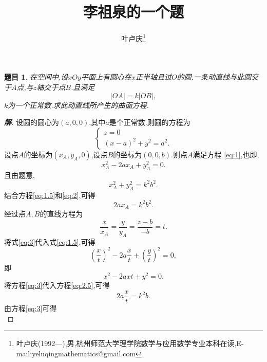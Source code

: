 \documentclass[a4paper]{article}
\newtheorem*{exe}{题目}
\newenvironment{exercise}
{\bigskip\begin{mdframed}\begin{exe}}
    {\end{exe}\end{mdframed}\bigskip}
\begin{document}
\title{\huge{\bf{李祖泉的一个题}}} \author{\small{叶卢庆\footnote{叶卢庆(1992---),男,杭州师范大学理学院数学与应用数学专业本科在读,E-mail:yeluqingmathematics@gmail.com}}}
\maketitle
\begin{exercise}
在空间中,设$xOy$平面上有圆心在$x$正半轴且过$O$的圆.一条动直线与此圆交
于$A$点,与$z$轴交于点$B$.且满足
$$
|OA|=k|OB|,
$$
$k$为一个正常数.求此动直线所产生的曲面方程.
\end{exercise}
\begin{proof}[\textbf{解}]
设圆的圆心为$(a,0,0)$,其中$a$是个正常数.则圆的方程为
\begin{equation}\label{eq:1}
\begin{cases}
z=0\\
(x-a)^2+y^2=a^2.
\end{cases}
\end{equation}
设点$A$的坐标为$(x_A,y_A,0)$,设点$B$的坐标为$(0,0,b)$.则点$A$满足方程
\eqref{eq:1},也即,
\begin{equation}\label{eq:1.5}
  x_A^2-2ax_A+y_{A}^2=0.
\end{equation}
且由题意,
\begin{equation}\label{eq:2}
x_A^2+y_A^2=k^2b^2.
\end{equation}
结合方程\eqref{eq:1.5}和\eqref{eq:2},可得
\begin{equation}
  \label{eq:2.5}
  2ax_A=k^2b^2.
\end{equation}
经过点$A,B$的直线方程为
\begin{equation}\label{eq:3}
\frac{x}{x_A}=\frac{y}{y_A}=\frac{z-b}{-b}=t.
\end{equation}
将式\eqref{eq:3}代入式\eqref{eq:1.5},可得
$$
  (\frac{x}{t})^2-2a \frac{x}{t}+(\frac{y}{t})^2=0,
$$
即
\begin{equation}
  \label{eq:4}
  x^2-2axt+y^2=0.
\end{equation}
将方程\eqref{eq:3}代入方程\eqref{eq:2.5},可得
\begin{equation}
  \label{eq:5}
  2a \frac{x}{t}=k^2b.
\end{equation}
由方程\eqref{eq:3}可得
\begin{equation}
  \label{eq:6}
  
\end{equation}

\end{proof}
\end{document}
